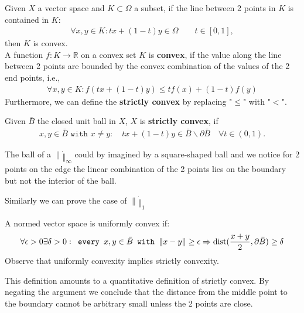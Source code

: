 \begin{definition}
Given $X$ a vector space and $K \subset \Omega$ a subset, if the line between 2 points in $K$ is contained in $K$:
\begin{align*}
	\forall x, y \in K: tx + (1-t)y \in \Omega \qquad t \in [0, 1],
\end{align*}
then $K$ is convex. \\
A function $f: K \rightarrow \mathbb{R}$ on a convex set $K$ is \textbf{convex}, if the value along the line between 2 points are bounded by the convex combination of the values of the 2 end points, i.e., 
\begin{align*}
	\forall x, y \in K: f(tx + (1-t)y) \leq t f(x) + (1-t) f(y)
\end{align*}
Furthermore, we can define the \textbf{strictly convex} by replacing "$\leq$" with "$<$".	
\end{definition}

\begin{definition}
	Given $\bar{B}$ the closed unit ball in $X$, $X$ is \textbf{strictly convex}, if 
	\begin{align*}
		x, y \in \bar{B} \texttt{ with } x \neq y: \quad t x + (1 - t)y  \in \bar{B} \backslash \partial\bar{B} \quad \forall t \in (0, 1).
	\end{align*}
\end{definition}

\begin{example}
	The ball of a $\|\dot\|_\infty$ could by imagined by a square-shaped ball and we notice for 2 points on the edge the linear combination of the 2 points lies on the boundary but not the interior of the ball.\par
	Similarly we can prove the case of $\| \dot \|_1$
\end{example}

\begin{definition}
	A normed vector space is uniformly convex if:
	\begin{align*}
		\forall \epsilon >0 \exists \delta >0: \texttt{ every }x, y \in \bar{B}\texttt{ with } \|x - y\| \geq \epsilon \Rightarrow \operatorname*{dist}(\frac{x+y}{2}, \partial \bar{B}) \geq \delta
	\end{align*}
	Observe that uniformly convexity implies strictly convexity.
\end{definition}
\begin{remark}
This definition amounts to a quantitative definition of strictly convex. By negating the argument we conclude that the distance from the middle point to the boundary cannot be arbitrary small unless the 2 points are close. 
\end{remark}

